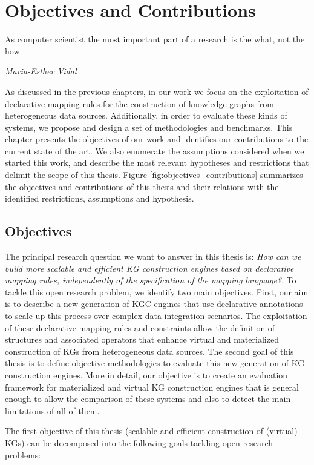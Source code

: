 \chapter{Objectives and Contributions}

\epigraph{As computer scientist the most important part of a research is the what, not the how}{\textit{Maria-Esther Vidal}}

\label{chap:objectives}
As discussed in the previous chapters, in our work we focus on the exploitation of declarative mapping rules for the construction of knowledge graphs from heterogeneous data sources. Additionally, in order to evaluate these kinds of systems, we propose and design a set of methodologies and benchmarks. This chapter presents the objectives of our work and identifies our contributions to the current state of the art. We also enumerate the assumptions considered when we started this work, and describe the most relevant hypotheses and restrictions that delimit the scope of this thesis. Figure \ref{fig:objectives_contributions} summarizes the objectives and contributions of this thesis and their relations with the identified restrictions, assumptions and hypothesis.

\section{Objectives}
The principal research question we want to answer in this thesis is: \textit{How can we build more scalable and efficient KG construction engines based on declarative mapping rules, independently of the specification of the mapping language?}. To tackle this open research problem, we identify two main objectives. 
First, our aim is to describe a new generation of KGC engines that use declarative annotations to scale up this process over complex data integration scenarios. The exploitation of these declarative mapping rules and constraints allow the definition of structures and associated operators that enhance virtual and materialized construction of KGs from heterogeneous data sources. The second goal of this thesis is to define objective methodologies to evaluate this new generation of KG construction engines. More in detail, our objective is to create an evaluation framework for materialized and virtual KG construction engines that is general enough to allow the comparison of these systems and also to detect the main limitations of all of them.

The first objective of this thesis (scalable and efficient construction of (virtual) KGs) can be decomposed into the following goals tackling open research problems:

